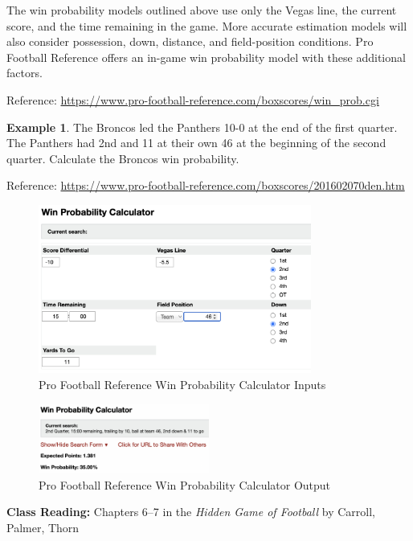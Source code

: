 \documentclass[
  11pt,
]{book}
\theoremstyle{definition}
\theoremstyle{definition}
\newtheorem{example}{Example}[chapter]
\theoremstyle{definition}
\theoremstyle{definition}
\theoremstyle{remark}
\begin{document}
\newpage

The win probability models outlined above use only the Vegas line, the current score, and the time remaining in the game. More accurate estimation models will also consider possession, down, distance, and field-position conditions. Pro Football Reference offers an in-game win probability model with these additional factors.

Reference: \url{https://www.pro-football-reference.com/boxscores/win_prob.cgi}

\begin{example}
The Broncos led the Panthers 10-0 at the end of the first quarter. The Panthers had 2nd and 11 at their own 46 at the beginning of the second quarter. Calculate the Broncos win probability.

Reference: \url{https://www.pro-football-reference.com/boxscores/201602070den.htm}
\end{example}

\begin{figure}
\centering
\includegraphics[width=0.8\textwidth,height=\textheight]{images/wp1}
\caption{Pro Football Reference Win Probability Calculator Inputs}
\end{figure}

\begin{figure}
\centering
\includegraphics[width=0.5\textwidth,height=\textheight]{images/wp2}
\caption{Pro Football Reference Win Probability Calculator Output}
\end{figure}

\textbf{Class Reading:} Chapters 6--7 in the \emph{Hidden Game of Football} by Carroll, Palmer, Thorn
\end{document}
